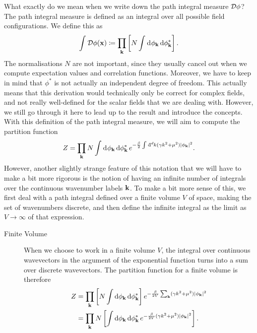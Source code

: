 What exactly do we mean when we write down the path integral measure $\pdd{\phi}$?
The path integral measure is defined as an integral over all possible field configurations. We define this as
\begin{equation}
  \int_{}^{} \pdd{\phi(\vb{x})} \coloneqq \prod_{\vb{k}} \left[N \int_{}^{} \dd[]{\phi_{\vb{k}}}  \dd{\phi^*_{\vb{k}}} \right].
\end{equation}
The normalisations $N$ are not important, since they usually cancel out when we compute expectation values and correlation functions.
Moreover, we have to keep in mind that $\phi^*$ is not actually an independent degree of freedom.
This actually means that this derivation would technically only be correct for complex fields, and not really well-defined for the scalar fields that we are dealing with. However, we still go through it here to lead up to the result and introduce the concepts.
With this definition of the path integral measure, we will aim to compute the partition function
\begin{equation}
  Z = \prod_{\vb{k}} N \int_{}^{} \dd[]{\phi_{\vb{k}}} \dd{\phi^*_{\vb{k}}} e^{-\frac{\beta}{2} \int_{}^{} \bdd[d]{k} (\gamma k^2 + \mu^2) \abs{\phi_{\vb{k}}}^2}.
\end{equation}
However, another slightly strange feature of this notation that we will have to make a bit more rigorous is the notion of having an infinite number of integrals over the continuous wavenumber labels $\vb{k}$. To make a bit more sense of this, we first deal with a path integral defined over a finite volume $V$ of space, making the set of wavenumbers discrete, and then define the infinite integral as the limit as $V \to \infty$ of that expression.
\begin{description}
  \item[Finite Volume] When we choose to work in a finite volume $V$, the integral over continuous wavevectors in the argument of the exponential function turns into a sum over discrete wavevectors. The partition function for a finite volume is therefore
    \begin{align}
      Z &= \prod_{\vb{k}} \left[ N \int \dd{\phi_{\vb{k}}} \dd{\phi^*_{\vb{k}}} \right] e^{-\frac{\beta}{2V} \sum_{\vb{k}} (\gamma k^2 + \mu^2) \abs{\phi_{\vb{k}}}^2} \\
	&= \prod_{\vb{k}} N \left[ \int \dd{\phi_{\vb{k}}} \dd{\phi^*_{\vb{k}}} e^{-\frac{\beta}{2 V}(\gamma k^2 + \mu^2) \abs{\phi_{\vb{k}}}^2} \right].
    \end{align}
\end{description}
